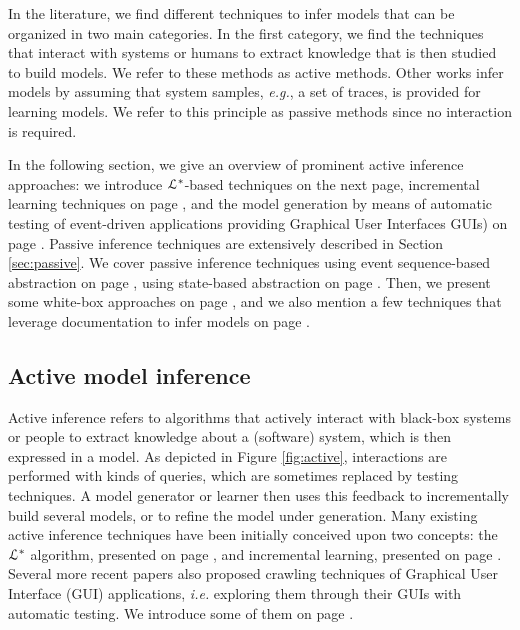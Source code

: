 In the literature, we find different techniques to infer
models that can be organized in two main categories. In the first
category, we find the techniques that interact with systems or
humans to extract knowledge that is then studied to build models.
We refer to these methods as active methods. Other works infer
models by assuming that system samples, \emph{e.g.}, a set of traces, is
provided for learning models. We refer to this principle as
passive methods since no interaction is required.

In the following section, we give an overview of prominent active
inference approaches: we introduce $\EuScript{L}^*$-based
techniques on the next page, incremental
learning techniques on page \pageref{sec:active-increment}, and
the model generation by means of automatic testing of
event-driven applications providing Graphical User Interfaces
GUIs) on page \pageref{sec:active-crawling}. Passive inference
techniques are extensively described in Section
\vref{sec:passive}. We cover passive inference techniques using
event sequence-based abstraction on page
\pageref{sec:passive-fsa}, using state-based abstraction on page
\pageref{sec:passive-spec}. Then, we present some white-box
approaches on page \pageref{sec:passive-white}, and we also
mention a few techniques that leverage documentation to infer
models on page \pageref{sec:passive-others}.


\subsection{Active model inference}
\label{sec:active}

Active inference refers to algorithms that actively interact with
black-box systems or people to extract knowledge about a
(software) system, which is then expressed in a model. As
depicted in Figure \ref{fig:active}, interactions are performed
with kinds of queries, which are sometimes replaced by testing
techniques. A model generator or learner then uses this feedback
to incrementally build several models, or to refine the model
under generation. Many existing active inference techniques have
been initially conceived upon two concepts: the $\EuScript{L}^*$
algorithm, presented on page \pageref{sec:active-letoile}, and
incremental learning, presented on page
\pageref{sec:active-increment}. Several more recent papers also
proposed crawling techniques of Graphical User Interface (GUI)
applications, \emph{i.e.} exploring them through their GUIs with
automatic testing. We introduce some of them on page
\pageref{sec:active-crawling}.


